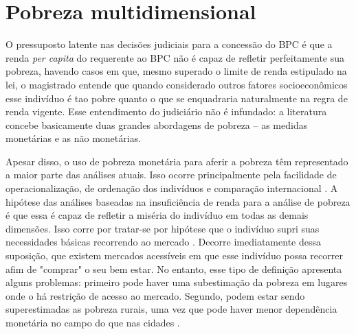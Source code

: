 \documentclass[
	12pt,				%
	openright,			%
	twoside,			%
	a4paper,			%
	english,			%
	french,				%
	spanish,			%
	brazil				%
	]{abntex2}
\begin{document}
\chapter{Pobreza multidimensional}

O pressuposto latente nas decisões judiciais para a concessão do BPC é que a renda \textit{per capita} do requerente ao BPC não é capaz de refletir perfeitamente sua pobreza, havendo casos em que, mesmo superado o limite de renda estipulado na lei, o magistrado entende que quando considerado outros fatores socioeconômicos esse indivíduo é tao pobre quanto o que se enquadraria naturalmente na regra de renda vigente. Esse entendimento do judiciário não é infundado: a literatura concebe basicamente duas grandes abordagens de pobreza -- as medidas monetárias e as não monetárias. 

Apesar disso, o uso de pobreza monetária para aferir a pobreza têm representado a maior parte das análises atuais. Isso ocorre principalmente pela facilidade de operacionalização, de ordenação dos indivíduos e comparação internacional \cite{lopes2003indicador}. A hipótese das análises baseadas na insuficiência de renda para a análise de pobreza é que essa é capaz de refletir a miséria do indivíduo em todas as demais dimensões. Isso corre por tratar-se por hipótese que o indivíduo supri suas necessidades básicas recorrendo ao mercado \cite{rocha2003pobreza}. Decorre imediatamente dessa suposição, que existem mercados acessíveis em que esse indivíduo possa recorrer afim de "comprar" o seu bem estar. No entanto, esse tipo de definição apresenta alguns problemas: primeiro pode haver uma subestimação da pobreza em lugares onde o há restrição de acesso ao mercado. Segundo, podem estar sendo superestimadas as pobreza rurais, uma vez que pode haver menor dependência monetária no campo do que nas cidades \cite{lopes2003indicador}.
\end{document}
